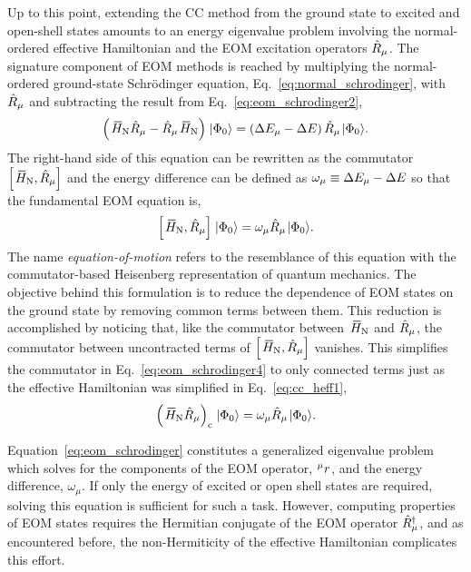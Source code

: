\documentclass[thesis.tex]{subfiles}
\begin{document}
Up to this point, extending the CC method from the ground state to excited and open-shell states amounts to an energy eigenvalue problem involving the normal-ordered effective Hamiltonian and the EOM excitation operators $\hat{R}\hspace{-0.1pt}_{\mu}$.  The signature component of EOM methods is reached by multiplying the normal-ordered ground-state Schr\"odinger equation, Eq.\ \eqref{eq:normal_schrodinger}, with $\hat{R}\hspace{-0.1pt}_{\mu}$ and subtracting the result from Eq.\ \eqref{eq:eom_schrodinger2},
\begin{equation} \label{eq:eom_schrodinger3}
  \left(\EHamN\Rop_{\mu} - \Rop_{\mu}\EHamN\right)\refket = \left(\Ecorr_{\mu} - \Ecorr\right)\Rop_{\mu}\refket.
\end{equation}
The right-hand side of this equation can be rewritten as the commutator $\left[ \EHamN,\Rop_{\mu} \right]$ and the energy difference can be defined as $\omega_{\mu} \equiv \Delta E_{\mu} - \Delta E$ so that the fundamental EOM equation is,
\begin{equation} \label{eq:eom_schrodinger4}
  \left[ \EHamN,\Rop_{\mu} \right]\refket = \omega_{\mu}\Rop_{\mu}\refket.
\end{equation}
The name \textit{equation-of-motion} refers to the resemblance of this equation with the commutator-based Heisenberg representation of quantum mechanics.  The objective behind this formulation is to reduce the dependence of EOM states on the ground state by removing common terms between them.  This reduction is accomplished by noticing that, like the commutator between $\EHamN$ and $\hat{R}\hspace{-0.1pt}_{\mu}$, the commutator between uncontracted terms of $\left[ \EHamN,\Rop_{\mu} \right]$ vanishes.  This simplifies the commutator in Eq.\ \eqref{eq:eom_schrodinger4} to only connected terms just as the effective Hamiltonian was simplified in Eq.\ \eqref{eq:cc_heff1},
\begin{equation} \label{eq:eom_schrodinger4}
  \left( \EHamN\Rop_{\mu} \right)_{\mathrm{c}}\refket = \omega_{\mu}\Rop_{\mu}\refket.
\end{equation}

Equation\ \eqref{eq:eom_schrodinger} constitutes a generalized eigenvalue problem which solves for the components of the EOM operator, ${}^{\mu}r^{}_{}$, and the energy difference, $\omega_{\mu}$.  If only the energy of excited or open shell states are required, solving this equation is sufficient for such a task.  However, computing properties of EOM states requires the Hermitian conjugate of the EOM operator $\hat{R}\hspace{-0.1pt}^{\dagger}_{\mu}$, and as encountered before, the non-Hermiticity of the effective Hamiltonian complicates this effort.
\end{document}
